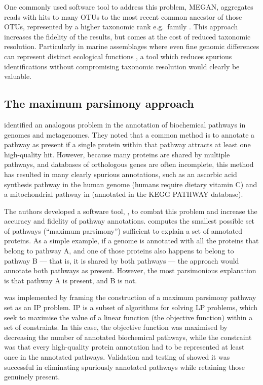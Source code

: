 One commonly used software tool to address this problem, \ac{MEGAN}, aggregates reads with hits to many \acp{OTU} to the most recent common ancestor of those \acp{OTU}, represented by a higher taxonomic rank e.g.\ family \cite{Huson:2007jl}.
This approach increases the fidelity of the results, but comes at the cost of reduced taxonomic resolution.
Particularly in marine assemblages where even fine genomic differences can represent distinct ecological functions \citep[e.g.][]{Brown:2012gna}, a tool which reduces spurious identifications without compromising taxonomic resolution would clearly be valuable. 

\subsection{The maximum parsimony approach}

\citet{Ye:2009bl} identified an analogous problem in the annotation of biochemical pathways in genomes and metagenomes.
They noted that a common method is to annotate a pathway as present if a single protein within that pathway attracts at least one high-quality  hit.
However, because many proteins are shared by multiple pathways, and databases of orthologous genes are often incomplete, this method has resulted in many clearly spurious annotations, such as an ascorbic acid synthesis pathway in the human genome (humans require dietary vitamin C) and a mitochondrial pathway in  (annotated in the \ac{KEGG} PATHWAY database).

The authors developed a software tool, , to combat this problem and increase the accuracy and fidelity of pathway annotations.
 computes the smallest possible set of pathways (``maximum parsimony'') sufficient to explain a set of annotated proteins.
As a simple example, if a genome is annotated with all the proteins that belong to pathway A, and one of those proteins also happens to belong to pathway B --- that is, it is shared by both pathways --- the \naive{} approach would annotate both pathways as present.
However, the most parsimonious explanation is that pathway A is present, and B is not.

 was implemented by framing the construction of a maximum parsimony pathway set as an \ac{IP} problem.
\ac{IP} is a subset of algorithms for solving \ac{LP} problems, which seek to maximise the value of a linear function (the objective function) within a set of constraints.
In this case, the objective function was maximised by decreasing the number of annotated biochemical pathways, while the constraint was that every high-quality protein annotation had to be represented at least once in the annotated pathways.
Validation and testing of  showed it was successful in eliminating spuriously annotated pathways while retaining those genuinely present.

